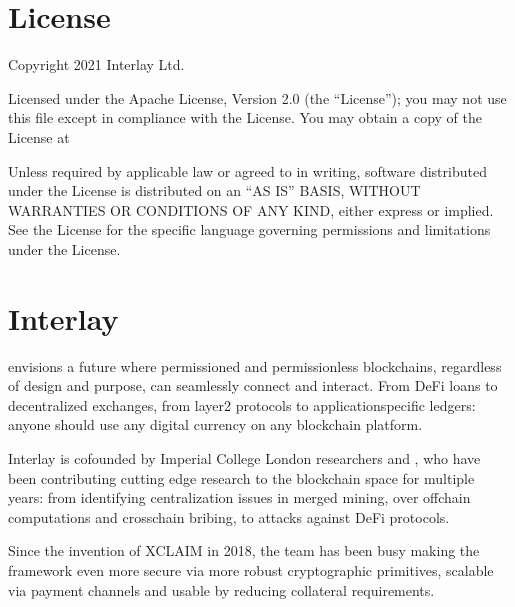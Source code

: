 \documentclass[a4paper,10pt,english]{sphinxmanual}
\begin{document}
\chapter{License}
\label{\detokenize{other/license:license}}\label{\detokenize{other/license::doc}}
Copyright 2021 Interlay Ltd.

Licensed under the Apache License, Version 2.0 (the “License”);
you may not use this file except in compliance with the License.
You may obtain a copy of the License at
\begin{quote}

\end{quote}

Unless required by applicable law or agreed to in writing, software
distributed under the License is distributed on an “AS IS” BASIS,
WITHOUT WARRANTIES OR CONDITIONS OF ANY KIND, either express or implied.
See the License for the specific language governing permissions and
limitations under the License.


\chapter{Interlay}
\label{\detokenize{other/interlay:interlay}}\label{\detokenize{other/interlay::doc}}
 envisions a future where permissioned and permissionless blockchains, regardless of design and purpose, can seamlessly connect and interact. From DeFi loans to decentralized exchanges, from layer\sphinxhyphen{}2 protocols to application\sphinxhyphen{}specific ledgers: anyone should use any digital currency on any blockchain platform.

Interlay is co\sphinxhyphen{}founded by Imperial College London researchers   and , who have been contributing cutting edge research to the blockchain space for multiple years: from identifying centralization issues in merged mining, over off\sphinxhyphen{}chain computations and cross\sphinxhyphen{}chain bribing, to attacks against DeFi protocols.

Since the invention of XCLAIM in 2018, the team has been busy making the framework even more secure via more robust cryptographic primitives, scalable via payment channels and usable by reducing collateral requirements.

\begin{figure}[htbp]
\centering

\noindent{}
\end{figure}



\renewcommand{\indexname}{Index}
\printindex
\end{document}
